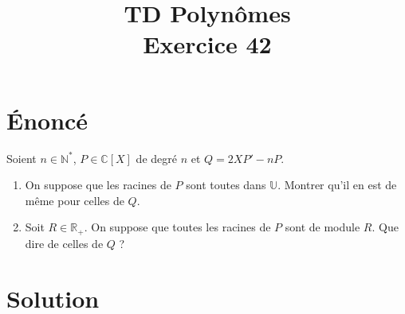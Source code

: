 \documentclass[french]{article}
\title{TD Polynômes \\ Exercice 42}
\date{}
\newcommand{\N}{\mathbb{N}}
\newcommand{\R}{\mathbb{R}}
\newcommand{\C}{\mathbb{C}}
\newcommand{\U}{\mathbb{U}}
\newcommand{\st}{^*}
\begin{document}
\maketitle

\section{Énoncé}
Soient $n\in\N\st$, $P\in\C[X]$ de degré $n$ et $Q=2XP'-nP$.
\begin{enumerate}
	\item On suppose que les racines de $P$ sont toutes dans $\U$. Montrer qu'il en est de même pour celles de $Q$.
	\item Soit $R\in\R_+$. On suppose que toutes les racines de $P$ sont de module $R$. Que dire de celles de $Q$ ?
\end{enumerate}
\section{Solution}
\end{document}
